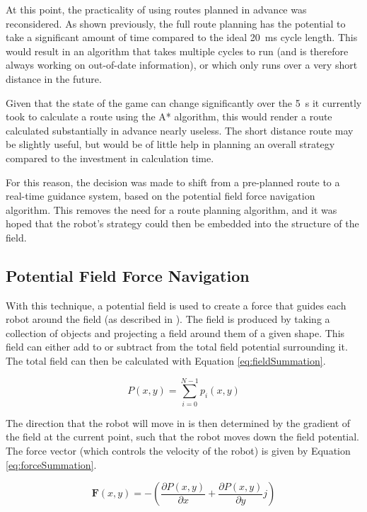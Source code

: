 \documentclass[10pt]{article}
\begin{document}
At this point, the practicality of using routes planned in advance was
reconsidered.  As shown previously, the full route planning has the potential to
take a significant amount of time compared to the ideal \SI{20}{\milli\second}
cycle length.  This would result in an algorithm that takes multiple cycles to
run (and is therefore always working on out-of-date information), or which only
runs over a very short distance in the future.

Given that the state of the game can change significantly over the
\SI{5}{\second} it currently took to calculate a route using the A* algorithm,
this would render a route calculated substantially in advance nearly useless. 
The short distance route may be slightly useful, but would be of little help in
planning an overall strategy compared to the investment in calculation time.

For this reason, the decision was made to shift from a pre-planned route to a
real-time guidance system, based on the potential field force navigation
algorithm. This removes the need for a route planning algorithm, and it was
hoped that the robot's strategy could then be embedded into the structure of the
field.

\subsection{Potential Field Force Navigation\label{sub:Potential-Field-Force}}

With this technique, a potential field is used to create a force that guides
each robot around the field (as described in
\cite{intelligentAlgorithmPathPlanning}). The field is produced by taking a
collection of objects and projecting a field around them of a given shape. This
field can either add to or subtract from the total field potential surrounding
it. The total field can then be calculated with Equation
\ref{eq:fieldSummation}.

\begin{equation}
P(x,y)=\sum_{i=0}^{N-1}p_{i}\left(x,y\right)\label{eq:fieldSummation}
\end{equation}

The direction that the robot will move in is then determined by the gradient of
the field at the current point, such that the robot moves down the field
potential. The force vector (which controls the velocity of the robot) is given
by Equation \ref{eq:forceSummation}.

\begin{equation}
\boldsymbol{F}(x,y)=-\left(\frac{{\partial P\left(x,y\right)}}{\partial x}+\frac{{\partial P\left(x,y\right)}}{\partial y}j\right)\label{eq:forceSummation}
\end{equation}
\end{document}
